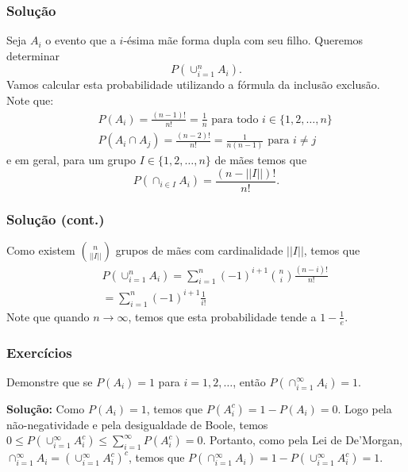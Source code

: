 \begin{frame}
\frametitle{\textbf{Solução}}
\baselineskip=13pt

Seja $A_i$ o evento que a $i$-ésima mãe forma dupla com seu filho. Queremos determinar
$$P(\cup_{i=1}^{n}A_i).$$
Vamos calcular esta probabilidade utilizando a fórmula da inclusão exclusão. Note que:
\begin{eqnarray}
& & P(A_i)=\frac{(n-1)!}{n!}=\frac{1}{n}\mbox{ para todo } i\in\{1,2,\ldots,n\} \nonumber\\
& & P(A_i\cap A_j)=\frac{(n-2)!}{n!}=\frac{1}{n(n-1)}\mbox{ para }i\ne j \nonumber
\end{eqnarray}
e em geral, para um grupo $I\in\{1,2,\ldots,n\}$ de mães temos que
$$P(\cap_{i\in I}A_i)=\frac{(n-||I||)!}{n!}.$$

\end{frame}

\begin{frame}
\frametitle{\textbf{Solução (cont.)}}
\baselineskip=13pt

Como existem $\binom{n}{||I||}$ grupos de mães com cardinalidade $||I||$, temos que
\begin{eqnarray}
& & P(\cup_{i=1}^{n}A_i)=\sum_{i=1}^{n}(-1)^{i+1}\binom{n}{i}\frac{(n-i)!}{n!} \nonumber\\
& & = \sum_{i=1}^{n}(-1)^{i+1}\frac{1}{i!}\nonumber
\end{eqnarray}
Note que quando $n\rightarrow\infty$, temos que esta probabilidade tende a $1-\frac{1}{e}$.


\end{frame}

\begin{frame}
\frametitle{\textbf{Exercícios}}
\baselineskip=13pt


\begin{example}
Demonstre que se $P(A_i)=1$ para $i=1,2,\ldots$, então $P(\cap_{i=1}^{\infty}A_i)=1$.

{\bf Solução: } Como $P(A_i)=1$, temos que $P(A_i^c)=1-P(A_i)=0$. Logo pela não-negatividade e pela desigualdade de Boole, temos
$0\leq P(\cup_{i=1}^{\infty}A_i^c)\leq \sum_{i=1}^{\infty}P(A_i^c)=0$. Portanto, como pela Lei de De'Morgan, $\cap_{i=1}^{\infty}A_i=(\cup_{i=1}^{\infty}A_i^c)^c$, temos que
$P(\cap_{i=1}^{\infty}A_i)=1-P(\cup_{i=1}^{\infty}A_i^c)=1$.
\end{example}

\end{frame}


